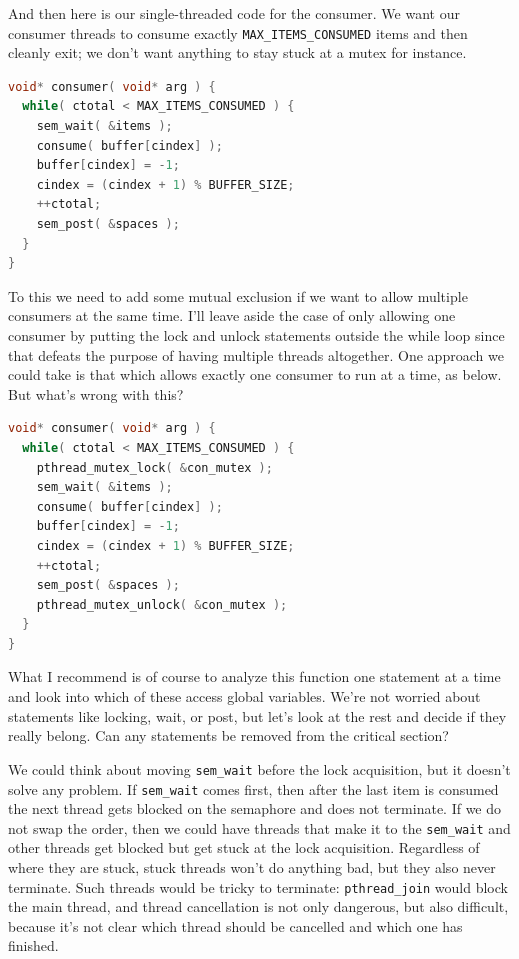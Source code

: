 \documentclass[a4paper]{report}
\begin{document}
And then here is our single-threaded code for the consumer. We want our consumer threads to consume exactly {\tt MAX\_ITEMS\_CONSUMED} items and then cleanly exit; we don't want anything to stay stuck at a mutex for instance.

\begin{lstlisting}[language=C]
void* consumer( void* arg ) { 
  while( ctotal < MAX_ITEMS_CONSUMED ) {
    sem_wait( &items );
    consume( buffer[cindex] );
    buffer[cindex] = -1;
    cindex = (cindex + 1) % BUFFER_SIZE;
    ++ctotal;
    sem_post( &spaces );
  }
}
\end{lstlisting}

To this we need to add some mutual exclusion if we want to allow multiple consumers at the same time. I'll leave aside the case of only allowing one consumer by putting the lock and unlock statements outside the while loop since that defeats the purpose of having multiple threads altogether. One approach we could take is that which allows exactly one consumer to run at a time, as below. But what's wrong with this?

\begin{lstlisting}[language=C]
void* consumer( void* arg ) { 
  while( ctotal < MAX_ITEMS_CONSUMED ) {
    pthread_mutex_lock( &con_mutex );
    sem_wait( &items );
    consume( buffer[cindex] );
    buffer[cindex] = -1;
    cindex = (cindex + 1) % BUFFER_SIZE;
    ++ctotal;
    sem_post( &spaces );
    pthread_mutex_unlock( &con_mutex );
  }
}
\end{lstlisting}

What I recommend is of course to analyze this function one statement at a time and look into which of these access global variables. We're not worried about statements like locking, wait, or post, but let's look at the rest and decide if they really belong. Can any statements be removed from the critical section?

We could think about moving {\tt sem\_wait} before the lock acquisition, but it doesn't solve any problem. If {\tt sem\_wait} comes first, then after the last item is consumed the next thread gets blocked on the semaphore and does not terminate. If we do not swap the order, then we could have threads that make it to the {\tt sem\_wait} and other threads get blocked but get stuck at the lock acquisition. Regardless of where they are stuck, stuck threads won't do anything bad, but they also never terminate. Such threads would be tricky to terminate: {\tt pthread\_join} would block the main thread, and thread cancellation is not only dangerous, but also difficult, because it's not clear which thread should be cancelled and which one has finished.
\end{document}
